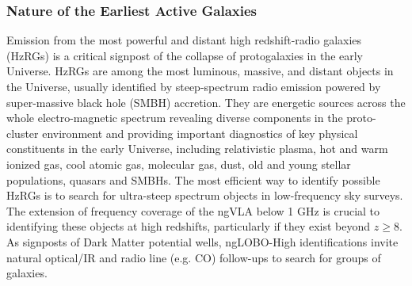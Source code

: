 \documentclass[11pt]{article}
\begin{document}

\subsubsection{Nature of the Earliest Active Galaxies}

Emission from the most powerful and distant high redshift-radio galaxies (HzRGs) is a critical signpost of the collapse of protogalaxies in the early Universe. HzRGs are among the most luminous, massive, and distant objects in the Universe, usually identified by steep-spectrum radio emission powered by super-massive black hole (SMBH) accretion. They are energetic sources across the whole electro-magnetic spectrum revealing diverse components in the proto-cluster environment and providing important diagnostics of key physical constituents in the early Universe, including relativistic plasma, hot and warm ionized gas, cool atomic gas, molecular gas, dust, old and young stellar populations, quasars and SMBHs. The most efficient way to identify possible HzRGs is to search for ultra-steep spectrum objects in low-frequency sky surveys. The extension of frequency coverage of the ngVLA below 1 GHz is crucial to identifying these objects at high redshifts, particularly if they exist beyond $z \geq 8$. As signposts of Dark Matter potential wells, ngLOBO-High identifications invite natural optical/IR and radio line (e.g. CO) follow-ups to search for groups of galaxies.
\end{document}
